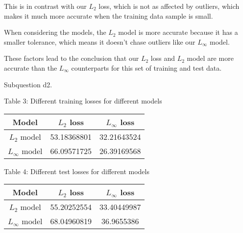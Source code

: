 \documentclass[12pt]{article}
\newcounter{ques}
\newenvironment{question}{\stepcounter{ques}{\noindent\bf Question \arabic{ques}:}}{\vspace{5mm}}
\begin{document}
\begin{question}
This is in contrast with our $L_2$ loss, which is not as affected by outliers, which makes it much more accurate when the training data sample is small.

When considering the models, the $L_2$ model is more accurate because it has a smaller tolerance, which means it doesn't chase outliers like our $L_{\infty}$ model.

These factors lead to the conclusion that our $L_2$ loss and $L_2$ model are more accurate than the $L_{\infty}$ counterparts for this set of training and test data.

\quad

\quad

\quad

Subquestion d2.

\begin{center}
Table 3: Different training losses for different models
\end{center}
\begin{table}[h]
\centering
\begin{tabular}{c|cc}
    \textbf{Model} & $L_2$ loss & $L_\infty$ loss \\
    \hline
    $L_2$ model   &      53.18368801      &         32.21643524        \\
    $L_\infty$ model &      66.09571725      &           26.39169568      
\end{tabular}
\end{table}

\begin{center}
Table 4: Different test losses for different models
\end{center}
\begin{table}[h]
\centering
\begin{tabular}{c|cc}
    \textbf{Model} & $L_2$ loss & $L_\infty$ loss \\
    \hline
    $L_2$ model   &      55.20252554      &        33.40449987         \\
    $L_\infty$ model &      68.04960819      &         36.9655386        
\end{tabular}
\end{table}

\end{question}

\newpage
\end{document}
